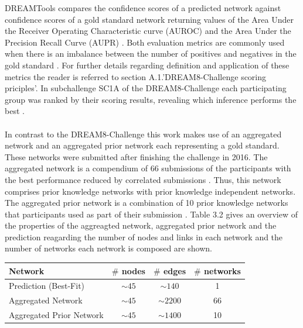 DREAMTools compares the confidence scores of a predicted network against confidence scores of a gold standard network returning values of the Area Under the Receiver Operating Characteristic curve (AUROC) and the Area Under the Precision Recall Curve (AUPR) \citep{Cokelaer.2015} \citep{Hill.2016}. Both evaluation metrics are commonly used when there is an imbalance between the number of positives and negatives in the gold standard \citep{Davis.2006}.
For further details regarding definition and application of these metrics the reader is referred to section A.1.'DREAM8-Challenge scoring priciples'. In subchallenge SC1A of the DREAM8-Challenge each participating group was ranked by their scoring results, revealing which inference performs the best \citep{authornamenotavailable}.\\\\

In contrast to the DREAM8-Challenge this work makes use of an aggregated network and an aggregated prior network each representing a gold standard. These networks were submitted after finishing the challenge in 2016. The aggregated network is a compendium of 66 submissions of the participants with the best performance reduced by correlated submissions \citep{Hill.2016}. Thus, this network comprises prior knowledge networks with prior knowledge independent networks.
The aggregated prior network is a combination of 10 prior knowledge networks that participants used as part of their submission \citep{Hill.2016}.
Table 3.2 gives an overview of the properties of the aggreagted network, aggregated prior network and the prediction reagarding the number of nodes and links in each network and the number of networks each network is composed are shown.

\begin{table}[H]
\begin{center}
\begin{tabular}{l|c|c|c}
\toprule 
Network & $\# $ nodes & $\# $ edges & $\# $ networks\\
 \hline\hline
Prediction (Best-Fit) & $\sim 45$ & $\sim 140$ & 1\\
\rowcolor{black!10} Aggregated Network & $\sim 45$ & $\sim 2200 $ & 66\\
Aggregated Prior Network & $\sim 45$ & $\sim 1400$ & 10\\
\bottomrule
\end{tabular}
\end{center}
\end{table} 

